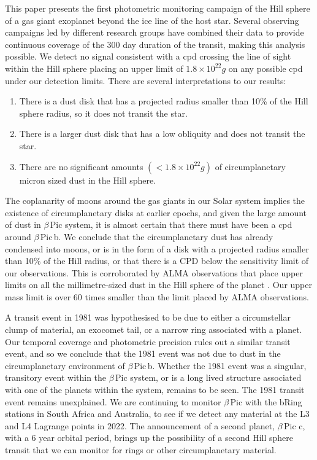 \documentclass[longauth]{aa} %
\newcommand{\bpb}{$\beta$\,Pic\,b}
\newcommand{\bp}{$\beta$\,Pic}
\begin{document}
This paper presents the first photometric monitoring campaign of the Hill sphere of a gas giant exoplanet beyond the ice line of the host star.
%
Several observing campaigns led by different research groups have combined their data to provide continuous coverage of the 300 day duration of the transit, making this analysis possible.
%
We detect no signal consistent with a \ac{cpd} crossing the line of sight within the Hill sphere placing an upper limit of $1.8\times 10^{22}g$ on any possible \ac{cpd} under our detection limits.
%
There are several interpretations to our results:
\begin{enumerate}
    \item There is a dust disk that has a projected radius smaller than 10\% of the Hill sphere radius, so it does not transit the star.
    \item There is a larger dust disk that has a low obliquity and does not transit the star.
    \item There are no significant amounts $(<1.8\times 10^{22}g)$ of circumplanetary micron sized dust in the Hill sphere.
\end{enumerate}

%
The coplanarity of moons around the gas giants in our Solar system implies the existence of circumplanetary disks at earlier epochs, and given the large amount of dust in \bp{} system, it is almost certain that there must have been a \ac{cpd} around \bpb{}.
%
We conclude that the circumplanetary dust has already condensed into moons, or is in the form of a disk with a projected radius smaller than 10\% of the Hill radius, or that there is a CPD below the sensitivity limit of our observations.
This is corroborated by ALMA observations that place upper limits on all the millimetre-sized dust in the Hill sphere of the planet \citep{Perez192}.
%
Our upper mass limit is over 60 times smaller than the limit placed by ALMA observations.

A transit event in 1981 was hypothesised to be due to either a circumstellar clump of material, an exocomet tail, or a narrow ring associated with a planet.
%
Our temporal coverage and photometric precision rules out a similar transit event, and so we conclude that the 1981 event was not due to dust in the circumplanetary environment of \bpb{}.
%
Whether the 1981 event was a singular, transitory event within the \bp{} system, or is a long lived structure associated with one of the planets within the system, remains to be seen.
%
The 1981 transit event remains unexplained.
%
We are continuing to monitor \bp{} with the bRing stations in South Africa and Australia, to see if we detect any material at the L3 and L4 Lagrange points in 2022.
%
The announcement of a second planet, \bp{} c, with a 6 year orbital period, brings up the possibility of a second Hill sphere transit that we can monitor for rings or other circumplanetary material.
\end{document}
